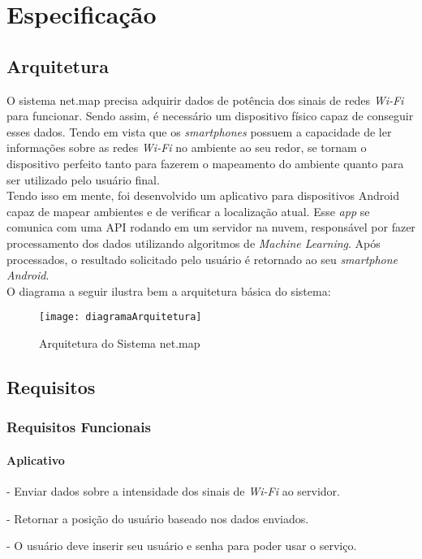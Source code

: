 
\chapter{Especificação}\label{chp:espec}

\section{Arquitetura}

O sistema net.map precisa adquirir dados de potência dos sinais de redes \textit{Wi-Fi} para funcionar. Sendo assim, é necessário um dispositivo físico capaz de conseguir esses dados. Tendo em vista que os \textit{smartphones} possuem a capacidade de ler informações sobre as redes \textit{Wi-Fi} no ambiente ao seu redor, se tornam o dispositivo perfeito tanto para fazerem o mapeamento do ambiente quanto para ser utilizado pelo usuário final.\\
Tendo isso em mente, foi desenvolvido um aplicativo para dispositivos Android capaz de mapear ambientes e de verificar a localização atual. Esse \textit{app} se comunica com uma API rodando em um servidor na nuvem, responsável por fazer processamento dos dados utilizando algoritmos de \textit{Machine Learning}. Após processados, o resultado solicitado pelo usuário é retornado ao seu \textit{smartphone Android}.\\
O diagrama a seguir ilustra bem a arquitetura básica do sistema:

\begin{figure}[H]
	\centering
	\caption{Arquitetura do Sistema net.map}
  \texttt{[image: diagramaArquitetura]}
\label{fig:diagramaArquitetura}
\end{figure}


\section{Requisitos}\label{sec:req}

\subsection{Requisitos Funcionais}

\subsubsection{Aplicativo}
- Enviar dados sobre a intensidade dos sinais de \textit{Wi-Fi} ao servidor. \par
- Retornar a posição do usuário baseado nos dados enviados.\par
- O usuário deve inserir seu usuário e senha para poder usar o serviço.
